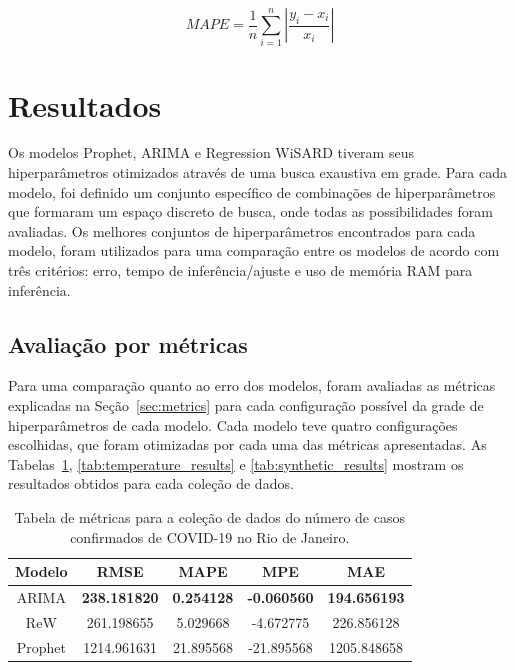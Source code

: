 \begin{equation} \label{eq:mape}
    MAPE=\dfrac{1}{n}\sum ^{n}_{i=1}\left| \dfrac{y_{i}-x_{i}}{x_{i}}\right|
\end{equation}

\section{Resultados}
Os modelos Prophet, ARIMA e Regression WiSARD tiveram seus hiperparâmetros otimizados através de uma busca exaustiva em grade. Para cada modelo, foi definido um conjunto específico de combinações de hiperparâmetros que formaram um espaço discreto de busca, onde todas as possibilidades foram avaliadas. Os melhores conjuntos de hiperparâmetros encontrados para cada modelo, foram utilizados para uma comparação entre os modelos de acordo com três critérios: erro, tempo de inferência/ajuste e uso de memória RAM para inferência.

\subsection{Avaliação por métricas}\label{subsec:metrics_eval}
Para uma comparação quanto ao erro dos modelos, foram avaliadas as métricas explicadas na Seção~\ref{sec:metrics} para cada configuração possível da grade de hiperparâmetros de cada modelo. Cada modelo teve quatro configurações escolhidas, que foram otimizadas por cada uma das métricas apresentadas. As Tabelas~\ref{tab:covid_results}, \ref{tab:temperature_results} e \ref{tab:synthetic_results} mostram os resultados obtidos para cada coleção de dados.


\begin{table}[!htp]
    \caption{Tabela de métricas para a coleção de dados do número de casos confirmados de COVID-19 no Rio de Janeiro.}\label{tab:covid_results}
    \centering
    \begin{tabular}{@{}ccccc@{}} \toprule
        Modelo  & RMSE                & MAPE              & MPE                & MAE                 \\ \midrule
        ARIMA   & \textbf{238.181820} & \textbf{0.254128} & \textbf{-0.060560} & \textbf{194.656193} \\
        ReW     & 261.198655          & 5.029668          & -4.672775          & 226.856128          \\
        Prophet & 1214.961631         & 21.895568         & -21.895568         & 1205.848658         \\ \bottomrule
    \end{tabular}
\end{table}

